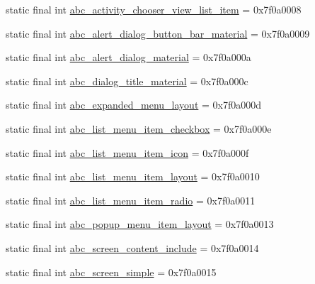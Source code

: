 \begin{DoxyCompactItemize}
static final int \mbox{\hyperlink{classcom_1_1google_1_1android_1_1gms_1_1R_1_1layout_aa1d045126b498908281e3dd63273909b}{abc\+\_\+activity\+\_\+chooser\+\_\+view\+\_\+list\+\_\+item}} = 0x7f0a0008
\item 
static final int \mbox{\hyperlink{classcom_1_1google_1_1android_1_1gms_1_1R_1_1layout_a35fca05c2250c436c4cf9d2701be6514}{abc\+\_\+alert\+\_\+dialog\+\_\+button\+\_\+bar\+\_\+material}} = 0x7f0a0009
\item 
static final int \mbox{\hyperlink{classcom_1_1google_1_1android_1_1gms_1_1R_1_1layout_a21a0570dcc3a70c5fc62d2bc5e2e5433}{abc\+\_\+alert\+\_\+dialog\+\_\+material}} = 0x7f0a000a
\item 
static final int \mbox{\hyperlink{classcom_1_1google_1_1android_1_1gms_1_1R_1_1layout_a20f6af205dc2b9116068a10e83c1cebc}{abc\+\_\+dialog\+\_\+title\+\_\+material}} = 0x7f0a000c
\item 
static final int \mbox{\hyperlink{classcom_1_1google_1_1android_1_1gms_1_1R_1_1layout_a01c7c6684e0e1c890c54dcad9d3ddeba}{abc\+\_\+expanded\+\_\+menu\+\_\+layout}} = 0x7f0a000d
\item 
static final int \mbox{\hyperlink{classcom_1_1google_1_1android_1_1gms_1_1R_1_1layout_a48b6df00c7bc0a84e9935458cd44d2f5}{abc\+\_\+list\+\_\+menu\+\_\+item\+\_\+checkbox}} = 0x7f0a000e
\item 
static final int \mbox{\hyperlink{classcom_1_1google_1_1android_1_1gms_1_1R_1_1layout_ac81d8176b7d915ed0218f28a530ff207}{abc\+\_\+list\+\_\+menu\+\_\+item\+\_\+icon}} = 0x7f0a000f
\item 
static final int \mbox{\hyperlink{classcom_1_1google_1_1android_1_1gms_1_1R_1_1layout_af7eb0f5cb9ba3e25e13941809d6e0892}{abc\+\_\+list\+\_\+menu\+\_\+item\+\_\+layout}} = 0x7f0a0010
\item 
static final int \mbox{\hyperlink{classcom_1_1google_1_1android_1_1gms_1_1R_1_1layout_aa0b96dcde64adb3443bfe92fe2f1d0d1}{abc\+\_\+list\+\_\+menu\+\_\+item\+\_\+radio}} = 0x7f0a0011
\item 
static final int \mbox{\hyperlink{classcom_1_1google_1_1android_1_1gms_1_1R_1_1layout_afa5c143027d9411d0a237a961f47a785}{abc\+\_\+popup\+\_\+menu\+\_\+item\+\_\+layout}} = 0x7f0a0013
\item 
static final int \mbox{\hyperlink{classcom_1_1google_1_1android_1_1gms_1_1R_1_1layout_ad31fe40816c2134479159bf2e03bf553}{abc\+\_\+screen\+\_\+content\+\_\+include}} = 0x7f0a0014
\item 
static final int \mbox{\hyperlink{classcom_1_1google_1_1android_1_1gms_1_1R_1_1layout_abc8f8f39febf96cc12ee436c0a688d65}{abc\+\_\+screen\+\_\+simple}} = 0x7f0a0015

\end{DoxyCompactItemize}
